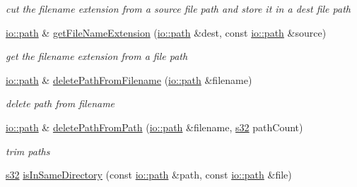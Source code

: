 \begin{DoxyCompactItemize}
\begin{DoxyCompactList}\small\item\em cut the filename extension from a source file path and store it in a dest file path \end{DoxyCompactList}\item 
\mbox{\label{namespaceirr_1_1core_aa7e21daf011b4818311a808efc986c1d}} 
\hyperlink{namespaceirr_1_1io_a6468281622ce3a1c46b72e19f32dded5}{io\+::path} \& \hyperlink{namespaceirr_1_1core_aa7e21daf011b4818311a808efc986c1d}{get\+File\+Name\+Extension} (\hyperlink{namespaceirr_1_1io_a6468281622ce3a1c46b72e19f32dded5}{io\+::path} \&dest, const \hyperlink{namespaceirr_1_1io_a6468281622ce3a1c46b72e19f32dded5}{io\+::path} \&source)
\begin{DoxyCompactList}\small\item\em get the filename extension from a file path \end{DoxyCompactList}\item 
\mbox{\label{namespaceirr_1_1core_ae07ea619eabed7c4554b35e39ac7e9ae}} 
\hyperlink{namespaceirr_1_1io_a6468281622ce3a1c46b72e19f32dded5}{io\+::path} \& \hyperlink{namespaceirr_1_1core_ae07ea619eabed7c4554b35e39ac7e9ae}{delete\+Path\+From\+Filename} (\hyperlink{namespaceirr_1_1io_a6468281622ce3a1c46b72e19f32dded5}{io\+::path} \&filename)
\begin{DoxyCompactList}\small\item\em delete path from filename \end{DoxyCompactList}\item 
\mbox{\label{namespaceirr_1_1core_a4aeb6819b814fda38bf1cc028787b3c2}} 
\hyperlink{namespaceirr_1_1io_a6468281622ce3a1c46b72e19f32dded5}{io\+::path} \& \hyperlink{namespaceirr_1_1core_a4aeb6819b814fda38bf1cc028787b3c2}{delete\+Path\+From\+Path} (\hyperlink{namespaceirr_1_1io_a6468281622ce3a1c46b72e19f32dded5}{io\+::path} \&filename, \hyperlink{namespaceirr_ac66849b7a6ed16e30ebede579f9b47c6}{s32} path\+Count)
\begin{DoxyCompactList}\small\item\em trim paths \end{DoxyCompactList}\item 
\mbox{\label{namespaceirr_1_1core_afc9926e02ab9727cd5998ab2ffa9fa32}} 
\hyperlink{namespaceirr_ac66849b7a6ed16e30ebede579f9b47c6}{s32} \hyperlink{namespaceirr_1_1core_afc9926e02ab9727cd5998ab2ffa9fa32}{is\+In\+Same\+Directory} (const \hyperlink{namespaceirr_1_1io_a6468281622ce3a1c46b72e19f32dded5}{io\+::path} \&path, const \hyperlink{namespaceirr_1_1io_a6468281622ce3a1c46b72e19f32dded5}{io\+::path} \&file)

\end{DoxyCompactItemize}
